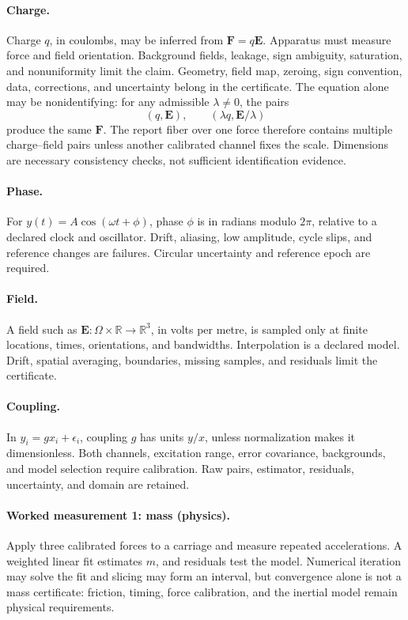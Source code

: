 \paragraph{Charge.} Charge \(q\), in coulombs, may be inferred from \(\mathbf F=q\mathbf E\).  Apparatus must measure
force and field orientation.  Background fields, leakage, sign ambiguity, saturation, and nonuniformity limit the
claim.  Geometry, field map, zeroing, sign convention, data, corrections, and uncertainty belong in the certificate.
The equation alone may be nonidentifying: for any admissible \(\lambda\ne0\), the pairs
\[
                         (q,\mathbf E),\qquad(\lambda q,\mathbf E/\lambda)
\]
produce the same \(\mathbf F\).  The report fiber over one force therefore contains multiple charge--field pairs
unless another calibrated channel fixes the scale.  Dimensions are necessary consistency checks, not sufficient
identification evidence.

\paragraph{Phase.} For \(y(t)=A\cos(\omega t+\phi)\), phase \(\phi\) is in radians modulo \(2\pi\), relative to a
declared clock and oscillator.  Drift, aliasing, low amplitude, cycle slips, and reference changes are failures.
Circular uncertainty and reference epoch are required.

\paragraph{Field.} A field such as \(\mathbf E:\Omega\times\mathbb R\to\mathbb R^3\), in volts per metre, is sampled
only at finite locations, times, orientations, and bandwidths.  Interpolation is a declared model.  Drift, spatial
averaging, boundaries, missing samples, and residuals limit the certificate.

\paragraph{Coupling.} In \(y_i=gx_i+\epsilon_i\), coupling \(g\) has units \(y/x\), unless normalization makes it
dimensionless.  Both channels, excitation range, error covariance, backgrounds, and model selection require
calibration.  Raw pairs, estimator, residuals, uncertainty, and domain are retained.

\paragraph{Worked measurement 1: mass (physics).} Apply three calibrated forces to a carriage and measure repeated
accelerations.  A weighted linear fit estimates \(m\), and residuals test the model.  Numerical iteration may solve
the fit and slicing may form an interval, but convergence alone is not a mass certificate: friction, timing, force
calibration, and the inertial model remain physical requirements.

